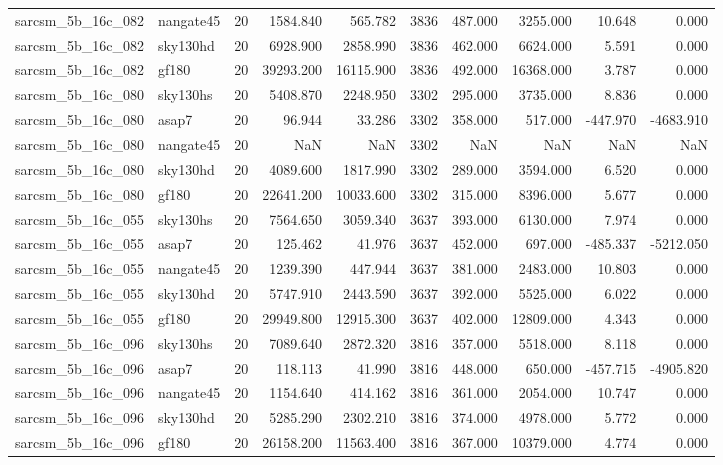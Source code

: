 \begin{longtable}{llrrrrrrrr}
sarcsm\_5b\_16c\_082 & nangate45 & 20 & 1584.840 & 565.782 & 3836 & 487.000 & 3255.000 & 10.648 & 0.000 \\
sarcsm\_5b\_16c\_082 & sky130hd & 20 & 6928.900 & 2858.990 & 3836 & 462.000 & 6624.000 & 5.591 & 0.000 \\
sarcsm\_5b\_16c\_082 & gf180 & 20 & 39293.200 & 16115.900 & 3836 & 492.000 & 16368.000 & 3.787 & 0.000 \\
sarcsm\_5b\_16c\_080 & sky130hs & 20 & 5408.870 & 2248.950 & 3302 & 295.000 & 3735.000 & 8.836 & 0.000 \\
sarcsm\_5b\_16c\_080 & asap7 & 20 & 96.944 & 33.286 & 3302 & 358.000 & 517.000 & -447.970 & -4683.910 \\
sarcsm\_5b\_16c\_080 & nangate45 & 20 & NaN & NaN & 3302 & NaN & NaN & NaN & NaN \\
sarcsm\_5b\_16c\_080 & sky130hd & 20 & 4089.600 & 1817.990 & 3302 & 289.000 & 3594.000 & 6.520 & 0.000 \\
sarcsm\_5b\_16c\_080 & gf180 & 20 & 22641.200 & 10033.600 & 3302 & 315.000 & 8396.000 & 5.677 & 0.000 \\
sarcsm\_5b\_16c\_055 & sky130hs & 20 & 7564.650 & 3059.340 & 3637 & 393.000 & 6130.000 & 7.974 & 0.000 \\
sarcsm\_5b\_16c\_055 & asap7 & 20 & 125.462 & 41.976 & 3637 & 452.000 & 697.000 & -485.337 & -5212.050 \\
sarcsm\_5b\_16c\_055 & nangate45 & 20 & 1239.390 & 447.944 & 3637 & 381.000 & 2483.000 & 10.803 & 0.000 \\
sarcsm\_5b\_16c\_055 & sky130hd & 20 & 5747.910 & 2443.590 & 3637 & 392.000 & 5525.000 & 6.022 & 0.000 \\
sarcsm\_5b\_16c\_055 & gf180 & 20 & 29949.800 & 12915.300 & 3637 & 402.000 & 12809.000 & 4.343 & 0.000 \\
sarcsm\_5b\_16c\_096 & sky130hs & 20 & 7089.640 & 2872.320 & 3816 & 357.000 & 5518.000 & 8.118 & 0.000 \\
sarcsm\_5b\_16c\_096 & asap7 & 20 & 118.113 & 41.990 & 3816 & 448.000 & 650.000 & -457.715 & -4905.820 \\
sarcsm\_5b\_16c\_096 & nangate45 & 20 & 1154.640 & 414.162 & 3816 & 361.000 & 2054.000 & 10.747 & 0.000 \\
sarcsm\_5b\_16c\_096 & sky130hd & 20 & 5285.290 & 2302.210 & 3816 & 374.000 & 4978.000 & 5.772 & 0.000 \\
sarcsm\_5b\_16c\_096 & gf180 & 20 & 26158.200 & 11563.400 & 3816 & 367.000 & 10379.000 & 4.774 & 0.000 \\

\end{longtable}
